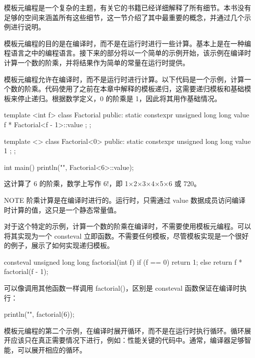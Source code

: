 
模板元编程是一个复杂的主题，有关它的书籍已经详细解释了所有细节。本书没有足够的空间来涵盖所有这些细节，这一节介绍了其中最重要的概念，并通过几个示例进行说明。

模板元编程的目的是在编译时，而不是在运行时进行一些计算。基本上是在一种编程语言之中的编程语言。接下来的部分将以一个简单的示例开始，该示例在编译时计算一个数的阶乘，并将结果作为简单的常量在运行时提供。


模板元编程允许在编译时，而不是运行时进行计算。以下代码是一个示例，计算一个数的阶乘。代码使用了之前在本章中解释的模板递归，这需要递归模板和基础模板来停止递归。根据数学定义，0 的阶乘是 1，因此将其用作基础情况。

\begin{cpp}
template <int f>
class Factorial
{
    public:
    static constexpr unsigned long long value { f * Factorial<f - 1>::value };
};

template <>
class Factorial<0>
{
    public:
    static constexpr unsigned long long value { 1 };
};

int main()
{
    println("{}", Factorial<6>::value);
}
\end{cpp}

这计算了 6 的阶乘，数学上写作 6!，即 1×2×3×4×5×6 或 720。

\begin{myNotic}{NOTE}
阶乘计算是在编译时进行的。运行时，只需通过 value 数据成员访问编译时计算的值，这只是一个静态常量值。
\end{myNotic}

对于这个特定的示例，计算一个数的阶乘在编译时，不需要使用模板元编程。可以将其实现为一个 consteval 立即函数。不需要任何模板，尽管模板实现是一个很好的例子，展示了如何实现递归模板。

\begin{cpp}
consteval unsigned long long factorial(int f)
{
    if (f == 0) { return 1; }
    else { return f * factorial(f - 1); }
}
\end{cpp}

可以像调用其他函数一样调用 factorial()，区别是 consteval 函数保证在编译时执行：

\begin{cpp}
println("{}", factorial(6));
\end{cpp}


模板元编程的第二个示例，在编译时展开循环，而不是在运行时执行循环。循环展开应该只在真正需要情况下进行，例如：性能关键的代码中。通常，编译器足够智能，可以展开相应的循环。

